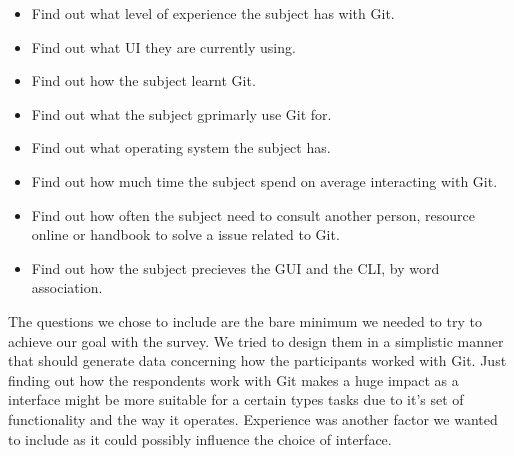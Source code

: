 \documentclass[a4paper,oneside]{bth} %
\begin{document}
					\begin{itemize}
						\item Find out what level of experience the subject has with Git.
						\item Find out what UI they are currently using.
						\item Find out how the subject learnt Git.
						\item Find out what the subject gprimarly use Git for.
						\item Find out what operating system the subject has.
						\item Find out how much time the subject spend on average interacting with Git.
						\item Find out how often the subject need to consult another person, resource online or handbook to solve a issue related to Git.
						\item Find out how the subject precieves the GUI and the CLI, by word association. 
					\end{itemize}
					The questions we chose to include are the bare minimum we needed to try to achieve our goal with the survey. We tried to design them in a simplistic manner that should generate data concerning how the participants worked with Git. Just finding out how the respondents work with Git makes a huge impact as a interface might be more suitable for a certain types tasks due to it's set of functionality and the way it operates.
					Experience was another factor we wanted to include as it could possibly influence the choice of interface.
					
\end{document}
